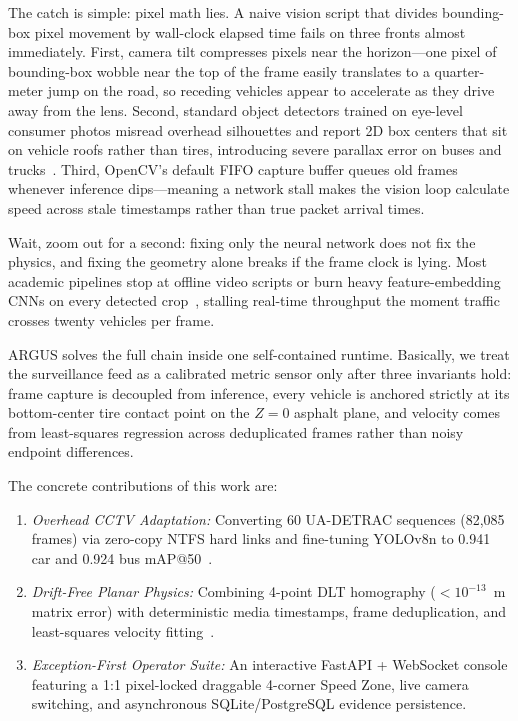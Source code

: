 \documentclass[conference]{IEEEtran}
\begin{document}
The catch is simple: pixel math lies. A naive vision script that divides bounding-box pixel movement by wall-clock elapsed time fails on three fronts almost immediately. First, camera tilt compresses pixels near the horizon---one pixel of bounding-box wobble near the top of the frame easily translates to a quarter-meter jump on the road, so receding vehicles appear to accelerate as they drive away from the lens. Second, standard object detectors trained on eye-level consumer photos misread overhead silhouettes and report 2D box centers that sit on vehicle roofs rather than tires, introducing severe parallax error on buses and trucks~\cite{ieeeaccess2024homography}. Third, OpenCV's default FIFO capture buffer queues old frames whenever inference dips---meaning a network stall makes the vision loop calculate speed across stale timestamps rather than true packet arrival times.

Wait, zoom out for a second: fixing only the neural network does not fix the physics, and fixing the geometry alone breaks if the frame clock is lying. Most academic pipelines stop at offline video scripts or burn heavy feature-embedding CNNs on every detected crop~\cite{wojke2017deepsort}, stalling real-time throughput the moment traffic crosses twenty vehicles per frame.

ARGUS solves the full chain inside one self-contained runtime. Basically, we treat the surveillance feed as a calibrated metric sensor only after three invariants hold: frame capture is decoupled from inference, every vehicle is anchored strictly at its bottom-center tire contact point on the $Z=0$ asphalt plane, and velocity comes from least-squares regression across deduplicated frames rather than noisy endpoint differences.

The concrete contributions of this work are:
\begin{enumerate}
  \item \textit{Overhead CCTV Adaptation:} Converting 60 UA-DETRAC sequences (82,085 frames) via zero-copy NTFS hard links and fine-tuning YOLOv8n to 0.941 car and 0.924 bus mAP@50~\cite{wen2020uadetrac,jocher2023yolov8}.
  \item \textit{Drift-Free Planar Physics:} Combining 4-point DLT homography ($<10^{-13}$~m matrix error) with deterministic media timestamps, frame deduplication, and least-squares velocity fitting~\cite{hartley2003multiple}.
  \item \textit{Exception-First Operator Suite:} An interactive FastAPI + WebSocket console featuring a 1:1 pixel-locked draggable 4-corner Speed Zone, live camera switching, and asynchronous SQLite/PostgreSQL evidence persistence.
\end{enumerate}
\end{document}
